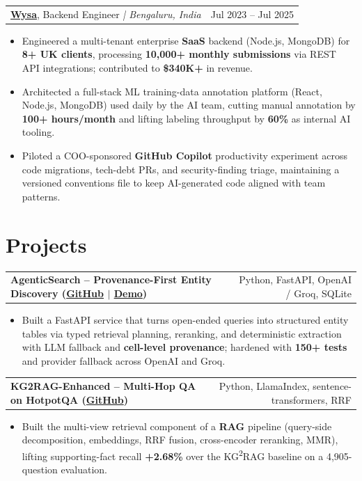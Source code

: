 \documentclass[letterpaper,11pt]{article}
\makeatletter
\newcommand{\expItem}[4]{%
  \vspace{2pt}
  \begin{tabular*}{\textwidth}{@{}l@{\extracolsep{\fill}}r@{}}
    \textbf{#1}, #2 \textit{| #3} & #4 \\
  \end{tabular*}\par\vspace{-3pt}
}
\newcommand{\projItem}[2]{%
  \vspace{2pt}
  \begin{tabular*}{\textwidth}{@{}l@{\extracolsep{\fill}}r@{}}
    \textbf{#1} & #2 \\
  \end{tabular*}\par\vspace{-3pt}
}
\makeatother
\begin{document}
\expItem{\href{https://www.wysa.io}{Wysa}}{Backend Engineer}{Bengaluru, India}{Jul 2023 -- Jul 2025}
\begin{itemize}
  \item Engineered a multi-tenant enterprise \textbf{SaaS} backend (Node.js, MongoDB) for \textbf{8+ UK clients}, processing \textbf{10{,}000+ monthly submissions} via REST API integrations; contributed to \textbf{\$340K+} in revenue.
  \item Architected a full-stack ML training-data annotation platform (React, Node.js, MongoDB) used daily by the AI team, cutting manual annotation by \textbf{100+ hours/month} and lifting labeling throughput by \textbf{60\%} as internal AI tooling.
  \item Piloted a COO-sponsored \textbf{GitHub Copilot} productivity experiment across code migrations, tech-debt PRs, and security-finding triage, maintaining a versioned conventions file to keep AI-generated code aligned with team patterns.
\end{itemize}

\section{Projects}

\projItem{AgenticSearch -- Provenance-First Entity Discovery {\normalfont\small(\href{https://github.com/Deva-1903/ciir_agentic_search}{GitHub} $\vert$ \href{https://agentic-search-negglszkwa-uc.a.run.app}{Demo})}}{Python, FastAPI, OpenAI / Groq, SQLite}
\begin{itemize}
  \item Built a FastAPI service that turns open-ended queries into structured entity tables via typed retrieval planning, reranking, and deterministic extraction with LLM fallback and \textbf{cell-level provenance}; hardened with \textbf{150+ tests} and provider fallback across OpenAI and Groq.
\end{itemize}

\projItem{KG2RAG-Enhanced -- Multi-Hop QA on HotpotQA {\normalfont\small(\href{https://github.com/Deva-1903/KG2RAG-685-NLP}{GitHub})}}{Python, LlamaIndex, sentence-transformers, RRF}
\begin{itemize}
  \item Built the multi-view retrieval component of a \textbf{RAG} pipeline (query-side decomposition, embeddings, RRF fusion, cross-encoder reranking, MMR), lifting supporting-fact recall \textbf{+2.68\%} over the KG\textsuperscript{2}RAG baseline on a 4{,}905-question evaluation.
\end{itemize}
\end{document}
